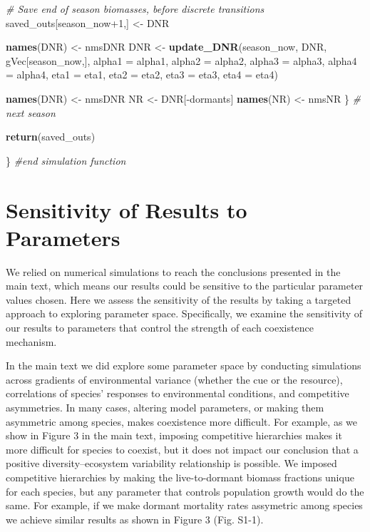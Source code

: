 \documentclass[11pt,]{article}
\newenvironment{Shaded}{\begin{snugshade}}{\end{snugshade}}
\newcommand{\KeywordTok}[1]{\textcolor[rgb]{0.13,0.29,0.53}{\textbf{{#1}}}}
\newcommand{\DataTypeTok}[1]{\textcolor[rgb]{0.13,0.29,0.53}{{#1}}}
\newcommand{\DecValTok}[1]{\textcolor[rgb]{0.00,0.00,0.81}{{#1}}}
\newcommand{\StringTok}[1]{\textcolor[rgb]{0.31,0.60,0.02}{{#1}}}
\newcommand{\CommentTok}[1]{\textcolor[rgb]{0.56,0.35,0.01}{\textit{{#1}}}}
\newcommand{\NormalTok}[1]{{#1}}
\begin{document}
\begin{Shaded}
\begin{Highlighting}[]
    \CommentTok{# Save end of season biomasses, before discrete transitions}
    \NormalTok{saved_outs[season_now}\DecValTok{+1}\NormalTok{,] <-}\StringTok{ }\NormalTok{DNR}
    
    \KeywordTok{names}\NormalTok{(DNR) <-}\StringTok{ }\NormalTok{nmsDNR}
    \NormalTok{DNR        <-}\StringTok{ }\KeywordTok{update_DNR}\NormalTok{(season_now, DNR, gVec[season_now,],}
                             \DataTypeTok{alpha1 =} \NormalTok{alpha1, }\DataTypeTok{alpha2 =} \NormalTok{alpha2, }
                             \DataTypeTok{alpha3 =} \NormalTok{alpha3, }\DataTypeTok{alpha4 =} \NormalTok{alpha4,}
                             \DataTypeTok{eta1 =} \NormalTok{eta1, }\DataTypeTok{eta2 =} \NormalTok{eta2, }\DataTypeTok{eta3 =} \NormalTok{eta3, }\DataTypeTok{eta4 =} \NormalTok{eta4)}
    
    \KeywordTok{names}\NormalTok{(DNR) <-}\StringTok{ }\NormalTok{nmsDNR}
    \NormalTok{NR         <-}\StringTok{ }\NormalTok{DNR[-dormants]  }
    \KeywordTok{names}\NormalTok{(NR)  <-}\StringTok{ }\NormalTok{nmsNR}
  \NormalTok{\} }\CommentTok{# next season}
  
  \KeywordTok{return}\NormalTok{(saved_outs)}
  
\NormalTok{\} }\CommentTok{#end simulation function}
\end{Highlighting}
\end{Shaded}

\newpage{}

\section{Sensitivity of Results to Parameters}

We relied on numerical simulations to reach the conclusions presented in
the main text, which means our results could be sensitive to the
particular parameter values chosen. Here we assess the sensitivity of
the results by taking a targeted approach to exploring parameter space.
Specifically, we examine the sensitivity of our results to parameters
that control the strength of each coexistence mechanism.

In the main text we did explore some parameter space by conducting
simulations across gradients of environmental variance (whether the cue
or the resource), correlations of species' responses to environmental
conditions, and competitive asymmetries. In many cases, altering model
parameters, or making them asymmetric among species, makes coexistence
more difficult. For example, as we show in Figure 3 in the main text,
imposing competitive hierarchies makes it more difficult for species to
coexist, but it does not impact our conclusion that a positive
diversity--ecosystem variability relationship is possible. We imposed
competitive hierarchies by making the live-to-dormant biomass fractions
unique for each species, but any parameter that controls population
growth would do the same. For example, if we make dormant mortality
rates assymetric among species we achieve similar results as shown in
Figure 3 (Fig. S1-1).
\end{document}
